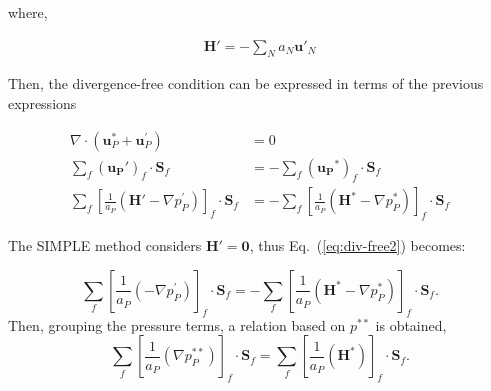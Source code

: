 \documentclass[final,3p,times,10pt,onecolumn]{myElsarticle}
\numberwithin{equation}{section}
\begin{document}
\noindent where,

\begin{align}
\label{eq:HPrima}
   \boldsymbol{H}' = - \sum_N a_N \boldsymbol{u}'_N 
\end{align}

Then, the divergence-free condition can be expressed in terms of the previous expressions

\begin{align} \label{eq:div-free1}
\nabla \cdot \left(\boldsymbol{u}_P^{*} + \boldsymbol{u}_P^{'}\right) &= 0 \\
\sum_f \left(\boldsymbol{u_P}'\right)_{f} \cdot \boldsymbol{S}_f &= -\sum_f \left(\boldsymbol{u_P}^{*}\right)_{f} \cdot \boldsymbol{S}_f \label{eq:div-free2} \\
\sum_f \left[\frac{1}{a_P}\left(\boldsymbol{H}' - \nabla p_P^{'}\right)\right]_f\cdot \boldsymbol{S}_f &= -\sum_f \left[\frac{1}{a_P}\left(\boldsymbol{H}^* - \nabla p_P^{*}\right)\right]_f \cdot \boldsymbol{S}_f \label{eq:div-free3}
\end{align}



The SIMPLE method considers $\boldsymbol{H}'=\boldsymbol{0}$, thus Eq.~(\ref{eq:div-free2}) becomes:

\begin{equation}
\sum_f 
\left[
\frac{1}{a_P}
\left(
-
\nabla p_P^{'}
\right)
\right]_f\cdot \boldsymbol{S}_f 
=
-\sum_f \left[\frac{1}{a_P}\left(\boldsymbol{H}^* - \nabla p_P^{*}\right)\right]_f \cdot
\boldsymbol{S}_f.
\label{eq:div-free4}    
\end{equation}
Then, grouping the pressure terms, a relation based on $p^{**}$ is obtained,
\begin{equation}
\sum_f 
\left[
\frac{1}{a_P}
\left(
\nabla p_P^{**}
\right)
\right]_f\cdot \boldsymbol{S}_f 
=
\sum_f 
\left[
\frac{1}{a_P}
\left(
\boldsymbol{H}^*
\right)
\right]_f
\cdot
\boldsymbol{S}_f.
\label{eq:div-free5}  
\end{equation}
\end{document}
